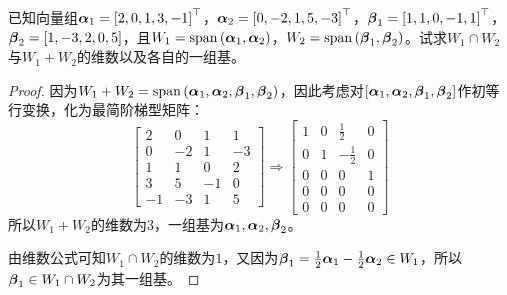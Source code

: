 \setcounter{problem}{15}
\begin{problem}
已知向量组\(\boldsymbol{\alpha}_1=\left[ 2,0,1,3,-1 \right]^\top\)，\(\boldsymbol{\alpha}_2=\left[ 0,-2,1,5,-3 \right]^\top\)，\(\boldsymbol{\beta}_1=\left[ 1,1,0,-1,1 \right]^\top\)，\(\boldsymbol{\beta}_2=\left[ 1,-3,2,0,5 \right]\)，且\(W_1=\mathrm{span}\left( \boldsymbol{\alpha}_1,\boldsymbol{\alpha}_2 \right)\)，\(W_2=\mathrm{span}\left( \boldsymbol{\beta}_1,\boldsymbol{\beta}_2 \right)\)。试求\(W_1\cap W_2\)与\(W_1+W_2\)的维数以及各自的一组基。
\end{problem}
\begin{proof}
    因为\(W_1+W_2=\mathrm{span}\left( \boldsymbol{\alpha}_1,\boldsymbol{\alpha}_2,\boldsymbol{\beta}_1,\boldsymbol{\beta}_2 \right)\)，因此考虑对\(\left[ \boldsymbol{\alpha}_1,\boldsymbol{\alpha}_2,\boldsymbol{\beta}_1,\boldsymbol{\beta}_2 \right]\)作初等行变换，化为最简阶梯型矩阵：
    \begin{equation*}
        \begin{bmatrix}
            2  & 0  & 1  & 1  \\
            0  & -2 & 1  & -3 \\
            1  & 1  & 0  & 2  \\
            3  & 5  & -1 & 0  \\
            -1 & -3 & 1  & 5
        \end{bmatrix}\Rightarrow
        \begin{bmatrix}
            1 & 0 & \frac{1}{2}  & 0 \\
            0 & 1 & -\frac{1}{2} & 0 \\
            0 & 0 & 0            & 1 \\
            0 & 0 & 0            & 0 \\
            0 & 0 & 0            & 0
        \end{bmatrix}
    \end{equation*}
    所以\(W_1+W_2\)的维数为\(3\)，一组基为\(\boldsymbol{\alpha}_1,\boldsymbol{\alpha}_2,\boldsymbol{\beta}_2\)。

    由维数公式可知\(W_1\cap W_2\)的维数为\(1\)，又因为\(\boldsymbol{\beta}_1=\frac{1}{2}\boldsymbol{\alpha}_1-\frac{1}{2}\boldsymbol{\alpha}_2\in W_1\)，所以\(\boldsymbol{\beta}_1\in W_1\cap W_2\)为其一组基。
\end{proof}

